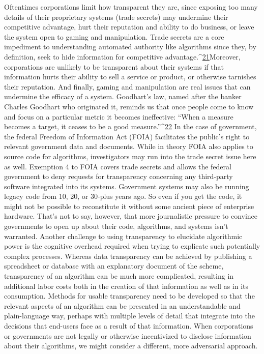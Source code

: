 Oftentimes corporations limit how transparent they are, since exposing too many details of their proprietary systems (trade secrets) may undermine their competitive advantage, hurt their reputation and ability to do business, or leave the system open to gaming and manipulation. Trade secrets are a core impediment to understanding automated authority like algorithms since they, by definition, seek to hide information for competitive advantage.^{\href{#endnotes}{21}}Moreover, corporations are unlikely to be transparent about their systems if that information hurts their ability to sell a service or product, or otherwise tarnishes their reputation. And finally, gaming and manipulation are real issues that can undermine the efficacy of a system. Goodhart's law, named after the banker Charles Goodhart who originated it, reminds us that once people come to know and focus on a particular metric it becomes ineffective: ``When a measure becomes a target, it ceases to be a good measure.''^{\href{#endnotes}{22}}
In the case of government, the federal Freedom of Information Act (FOIA) facilitates the public's right to relevant government data and documents. While in theory FOIA also applies to source code for algorithms, investigators may run into the trade secret issue here as well. Exemption 4 to FOIA covers trade secrets and allows the federal government to deny requests for transparency concerning any third-party software integrated into its systems. Government systems may also be running legacy code from 10, 20, or 30-plus years ago. So even if you get the code, it might not be possible to reconstitute it without some ancient piece of enterprise hardware. That's not to say, however, that more journalistic pressure to convince governments to open up about their code, algorithms, and systems isn't warranted. 
Another challenge to using transparency to elucidate algorithmic power is the cognitive overhead required when trying to explicate such potentially complex processes. Whereas data transparency can be achieved by publishing a spreadsheet or database with an explanatory document of the scheme, transparency of an algorithm can be much more complicated, resulting in additional labor costs both in the creation of that information as well as in its consumption. Methods for usable transparency need to be developed so that the relevant aspects of an algorithm can be presented in an understandable and plain-language way, perhaps with multiple levels of detail that integrate into the decisions that end-users face as a result of that information. 
When corporations or governments are not legally or otherwise incentivized to disclose information about their algorithms, we might consider a different, more adversarial approach. 
